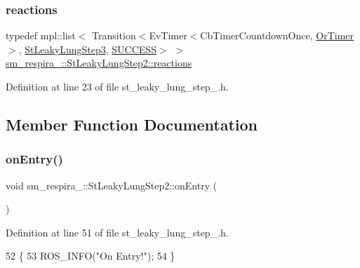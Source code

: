 \subsubsection{\texorpdfstring{reactions}{reactions}}
{\footnotesize\ttfamily typedef mpl\+::list$<$ Transition$<$Ev\+Timer$<$Cb\+Timer\+Countdown\+Once, \hyperlink{classsm__respira__1_1_1OrTimer}{Or\+Timer}$>$, \hyperlink{structsm__respira__1_1_1StLeakyLungStep3}{St\+Leaky\+Lung\+Step3}, \hyperlink{classSUCCESS}{S\+U\+C\+C\+E\+SS}$>$ $>$ \hyperlink{structsm__respira__1_1_1StLeakyLungStep2_a6f3328bf0e1d12655e24a208d19ca9e2}{sm\+\_\+respira\+\_\+::\+St\+Leaky\+Lung\+Step2\+::reactions}}



Definition at line 23 of file st\+\_\+leaky\+\_\+lung\+\_\+step\+\_.\+h.



\subsection{Member Function Documentation}
\mbox{\label{structsm__respira__1_1_1StLeakyLungStep2_aebc4c0d97507811a87b9eb4142a43892}} 
\subsubsection{\texorpdfstring{on\+Entry()}{onEntry()}}
{\footnotesize\ttfamily void sm\+\_\+respira\+\_\+::\+St\+Leaky\+Lung\+Step2\+::on\+Entry (\begin{DoxyParamCaption}{ }\end{DoxyParamCaption})\hspace{0.3cm}{\ttfamily [inline]}}



Definition at line 51 of file st\+\_\+leaky\+\_\+lung\+\_\+step\+\_.\+h.


\begin{DoxyCode}
52     \{
53         ROS\_INFO(\textcolor{stringliteral}{"On Entry!"});
54     \}
\end{DoxyCode}
\mbox{\label{structsm__respira__1_1_1StLeakyLungStep2_a6f74468d8e014222e8d17d3a9f506c51}} 
